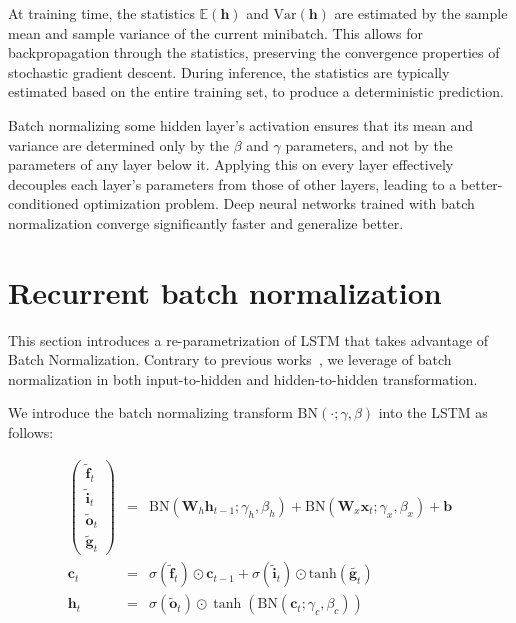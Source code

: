 \documentclass{article} %
\newcommand{\vect}[1]{\mathbf{#1}}
\newcommand{\mat}[1]{\mathbf{#1}}
\newcommand{\ewprod}{\odot}
\begin{document}
At training time, the statistics $\mathbb{E}(\vect{h})$ and $\mathrm{Var}(\vect{h})$ are estimated by the sample mean and sample variance of the current minibatch.
This allows for backpropagation through the statistics, preserving the convergence properties of stochastic gradient descent.
During inference, the statistics are typically estimated based on the entire training set, to produce a deterministic prediction.

Batch normalizing some hidden layer's activation ensures that its mean and variance are determined only by the $\beta$ and $\gamma$ parameters, and not by the parameters of any layer below it.
Applying this on every layer effectively decouples each layer's parameters from those of other layers, leading to a better-conditioned optimization problem.
Deep neural networks trained with batch normalization converge significantly faster and generalize better.

\section{Recurrent batch normalization}
\label{sec:recurrent-batch-normalization}

This section introduces a re-parametrization of LSTM that takes advantage
of Batch Normalization. Contrary to previous works~\cite{cesar, baidu}, we leverage of batch normalization in both input-to-hidden and hidden-to-hidden transformation.


We introduce the batch normalizing transform $\mathrm{BN}(\cdot; \gamma, \beta)$ into the LSTM as follows:

\begin{eqnarray}
\left(\begin{array}{ccc}
\tilde{\vect{f}}_t \\
\tilde{\vect{i}}_t \\
\tilde{\vect{o}}_t \\
\tilde{\vect{g}}_t
\end{array}\right)
 &=&
 \mathrm{BN} (\mat{W}_h \vect{h}_{t-1}; \gamma_h, \beta_h) +
 \mathrm{BN} (\mat{W}_x \vect{x}_t    ; \gamma_x, \beta_x) +
 \vect{b}
\\
\vect{c}_t &=& \sigma(\tilde{\vect{f}}_t) \ewprod \vect{c}_{t-1} +
              \sigma(\tilde{\vect{i}}_t) \ewprod \mathrm{tanh}(\tilde{\vect{g}_t}) \\
\vect{h}_t &=& \sigma(\tilde{\vect{o}}_t) \ewprod \tanh(
 \mathrm{BN} (\vect{c}_t; \gamma_c, \beta_c)
)
\end{eqnarray}
\end{document}
